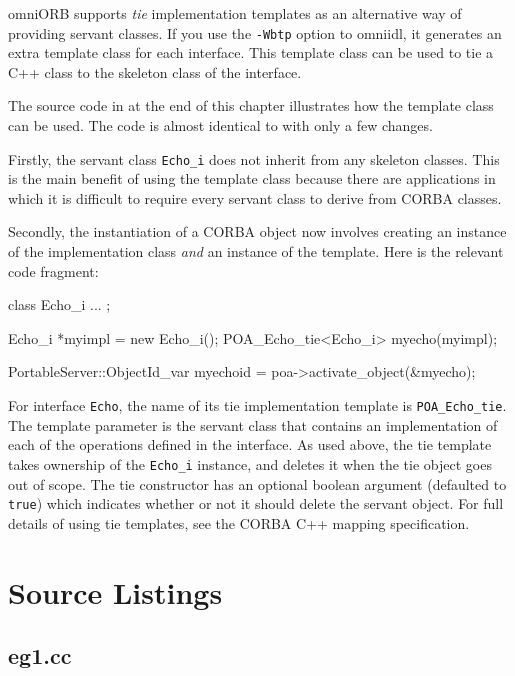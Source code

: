 \documentclass[11pt,twoside,a4paper]{book}
\newcommand{\type}[1]{\texttt{#1}}
\newcommand{\intf}[1]{\texttt{#1}}
\newcommand{\code}[1]{\texttt{#1}}
\newcommand{\term}[1]{\textit{#1}}
\newcommand{\file}{\begingroup \urlstyle{tt}\Url}
\newcommand{\dsc}{\discretionary{}{}{}}
\begin{document}
omniORB supports \term{tie} implementation templates as an alternative
way of providing servant classes. If you use the \texttt{-Wbtp} option
to omniidl, it generates an extra template class for each interface.
This template class can be used to tie a C++ class to the skeleton
class of the interface.

The source code in \file{eg3_tieimpl.cc} at the end of this chapter
illustrates how the template class can be used. The code is almost
identical to \file{eg3_impl.cc} with only a few changes.

Firstly, the servant class \type{Echo\_i} does not inherit from any
skeleton classes. This is the main benefit of using the template class
because there are applications in which it is difficult to require
every servant class to derive from CORBA classes.

Secondly, the instantiation of a CORBA object now involves creating an
instance of the implementation class \emph{and} an instance of the
template.  Here is the relevant code fragment:

\begin{cxxlisting}
class Echo_i { ... };

Echo_i *myimpl = new Echo_i();
POA_Echo_tie<Echo_i> myecho(myimpl);

PortableServer::ObjectId_var myechoid = poa->activate_object(&myecho);
\end{cxxlisting}


For interface \intf{Echo}, the name of its tie implementation template
is \type{POA\_Echo\_\dsc{}tie}. The template parameter is the servant
class that contains an implementation of each of the operations
defined in the interface. As used above, the tie template takes
ownership of the \type{Echo\_i} instance, and deletes it when the tie
object goes out of scope. The tie constructor has an optional boolean
argument (defaulted to \code{true}) which indicates whether or not it
should delete the servant object. For full details of using tie
templates, see the CORBA C++ mapping specification.


\clearpage
\section{Source Listings}

\subsection{eg1.cc}


\end{document}
